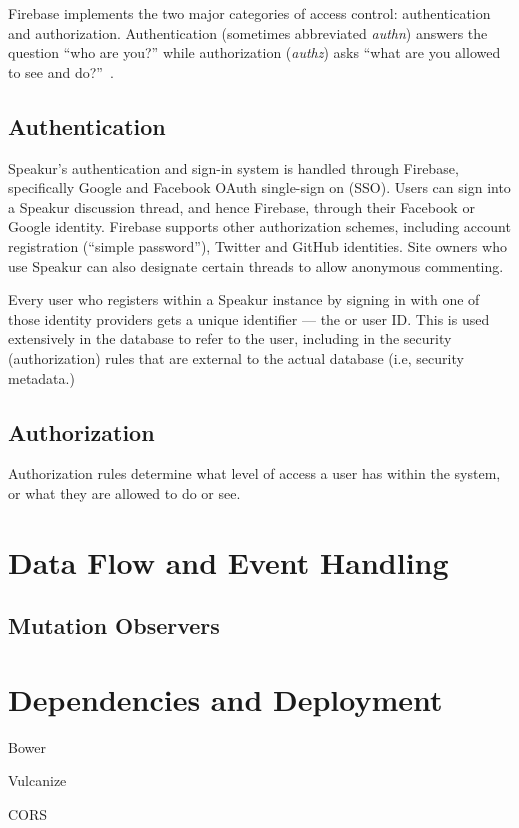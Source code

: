Firebase implements the two major categories of access control: authentication and 
authorization. 
Authentication (sometimes abbreviated \textit{authn}) answers the question ``who are you?'' 
while authorization (\textit{authz}) asks ``what are you allowed to see and do?''~\cite{stallings2011}.


\subsection{Authentication}

Speakur's authentication and sign-in system is handled through Firebase, 
specifically Google and Facebook OAuth single-sign on (SSO).
Users can sign into a Speakur discussion thread, and hence Firebase, through their Facebook or Google identity.
Firebase supports other authorization schemes, including account registration (``simple password''), Twitter and GitHub identities.
Site owners who use Speakur can also designate certain threads to allow anonymous commenting.

Every user who registers within a Speakur instance by signing in with one of those identity providers gets a unique identifier --- the  or user ID. 
This  is used extensively in the database to refer to the user, including in the security (authorization) rules that are external to the actual database (i.e, security metadata.) 

\subsection{Authorization}
Authorization rules determine what level of access a user has within the system, or what they are allowed to do or see.


\section{Data Flow and Event Handling}

\subsection{Mutation Observers}

\section{Dependencies and Deployment}

Bower

Vulcanize

CORS

